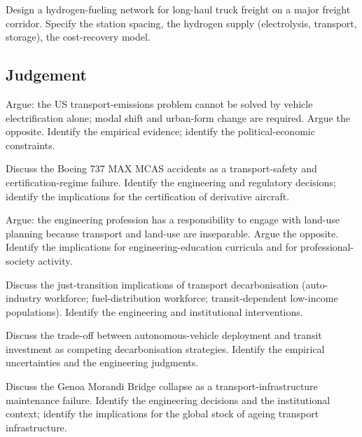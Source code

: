 \begin{exercise}
Design a hydrogen-fueling network for long-haul truck freight on a major freight corridor. Specify the station spacing, the hydrogen supply (electrolysis, transport, storage), the cost-recovery model.
\end{exercise}

\subsection*{Judgement}

\begin{exercise}
Argue: the US transport-emissions problem cannot be solved by vehicle electrification alone; modal shift and urban-form change are required. Argue the opposite. Identify the empirical evidence; identify the political-economic constraints.
\end{exercise}

\begin{exercise}
Discuss the Boeing 737 MAX MCAS accidents as a transport-safety and certification-regime failure. Identify the engineering and regulatory decisions; identify the implications for the certification of derivative aircraft.
\end{exercise}

\begin{exercise}
Argue: the engineering profession has a responsibility to engage with land-use planning because transport and land-use are inseparable. Argue the opposite. Identify the implications for engineering-education curricula and for professional-society activity.
\end{exercise}

\begin{exercise}
Discuss the just-transition implications of transport decarbonisation (auto-industry workforce; fuel-distribution workforce; transit-dependent low-income populations). Identify the engineering and institutional interventions.
\end{exercise}

\begin{exercise}
Discuss the trade-off between autonomous-vehicle deployment and transit investment as competing decarbonisation strategies. Identify the empirical uncertainties and the engineering judgments.
\end{exercise}

\begin{exercise}
Discuss the Genoa Morandi Bridge collapse as a transport-infrastructure maintenance failure. Identify the engineering decisions and the institutional context; identify the implications for the global stock of ageing transport infrastructure.
\end{exercise}
